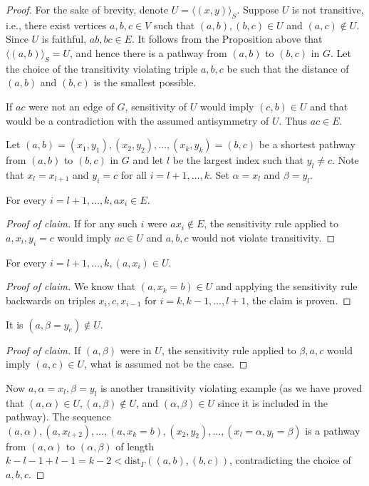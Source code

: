 \begin{proof}
	For the sake of brevity, denote $U = \langle(x, y)\rangle_S$. Suppose $U$ is not transitive, i.e., there exist vertices $a, b, c \in V$ such that $(a, b), (b, c) \in U$ and $(a, c) \notin U$. Since $U$ is faithful, $ab, bc \in E$. It follows from the Proposition above that $\langle(a, b)\rangle_S = U$, and hence there is a pathway from $(a, b)$ to $(b, c)$ in $G$. Let the choice of the transitivity violating triple $a, b, c$ be such that the distance of $(a, b)$ and $(b, c)$ is the smallest possible.
	
	If $ac$ were not an edge of $G$, sensitivity of $U$ would imply $(c, b) \in U$ and that would be a contradiction with the assumed antisymmetry of $U$. Thus $ac \in E$.
	
	Let $(a, b) = (x_1 , y_1), (x_2 , y_2), \dots, (x_k , y_k ) = (b, c)$ be a shortest pathway from $(a, b)$ to $(b, c)$ in $G$ and let $l$ be the largest index such that $y_l \neq c$. Note that $x_l = x_{l+1}$ and $y_i = c$ for all $i = l + 1, \dots, k$. Set $\alpha = x_l$ and $\beta = y_l$.
	
	\begin{claim}
		For every $i = l+1, \dots, k, ax_i \in E$.
	\end{claim}
	
	\begin{proof}[Proof of claim]
		If for any such $i$ were $ax_i \notin E$, the sensitivity rule applied to $a, x_i , y_i = c$ would imply $ac \in U$ and $a, b, c$ would not violate transitivity.
	\end{proof}
	
	\begin{claim}
		For every $i = l+1, \dots, k, (a, x_i) \in U$.
	\end{claim}
	
	\begin{proof}[Proof of claim]
		We know that $(a, x_k = b) \in U$ and applying the sensitivity rule backwards on triples $x_i , c, x_{i-1}$ for $i = k, k - 1, \dots, l + 1$, the claim is proven.
	\end{proof}
	
	\begin{claim}
		It is $(a, \beta = y_e) \notin U$.
	\end{claim}
	
	\begin{proof}[Proof of claim]
		If $(a, \beta)$ were in $U$, the sensitivity rule applied to $\beta, a, c$ would imply $(a, c) \in U$, what is assumed not be the case.
	\end{proof}
	
	Now $a, \alpha = x_l , \beta = y_l$ is another transitivity violating example (as we have proved that $(a, \alpha) \in U , (a, \beta) \notin U$, and $(\alpha, \beta) \in U$ since it is included in the pathway). The sequence $(a, \alpha), (a, x_{l+2}), \dots, (a, x_k = b), (x_2 , y_2 ), \dots, (x_l = \alpha, y_l = \beta)$ is a pathway from $(a, \alpha)$ to $(\alpha, \beta)$ of length $k - l-  1 + l - 1 = k - 2 < \text{dist}_\Gamma ((a, b), (b, c))$, contradicting the choice of $a, b, c$.
\end{proof}

